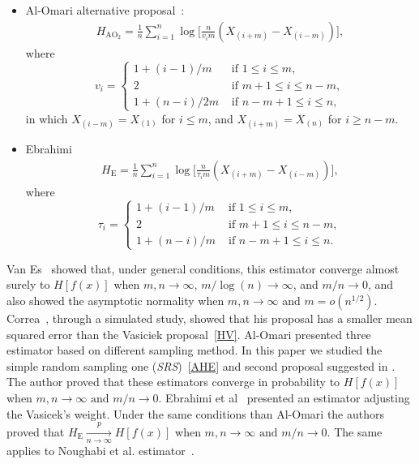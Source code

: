 \documentclass[journal]{IEEEtran}
\begin{document}
\begin{itemize}
		\item Al-Omari alternative proposal~\cite{AlOmari2016}:
		\label{AO2}
		\begin{align}
			H_{{\text{AO}}_2}=\frac{1}{n} \sum_{i=1}^{n} \log \Big[\frac{n}{v_{i} m}\left(X_{(i+m)}-X_{(i-m)}\right)\Big],
		\end{align}
		where
		\begin{equation*}
			v_{i}=\begin{cases}
				1+(i-1)/m & \text{ if }1 \leq i \leq m, \\
				2 & \text{ if } m+1 \leq i \leq n-m, \\
				1+(n-i)/2m & \text{ if } n-m+1 \leq i \leq n,
			\end{cases}
		\end{equation*}
		in which $X_{(i-m)}=X_{(1)}$ for $i \leq m$, and $X_{(i+m)}=X_{(n)}$ for $i \geq n-m$.
		\item Ebrahimi~\cite{Ebrahimi94}
		\begin{align}
			H_\text{E}=\frac{1}{n} \sum_{i=1}^{n} \log \Big[\frac{n}{\tau_{i} m}\left(X_{(i+m)}-X_{(i-m)}\right)\Big],
			\label{HE}
		\end{align}
		where
		\begin{equation*}
			\tau_{i}=\begin{cases}
				1+(i-1)/m & \text{ if }1 \leq i \leq m, \\
				2 & \text{ if } m+1 \leq i \leq n-m, \\
				1+(n-i)/m & \text{ if } n-m+1 \leq i \leq n.
			\end{cases}
		\end{equation*}
	\end{itemize}

Van Es~\cite{VanEs92} showed that, under general conditions, this estimator converge almost surely to $H[f(x)]$ when $m, n \to \infty$, $m/\log(n) \to \infty$, and $m/n \to 0$, and also showed the asymptotic normality when $m, n \to \infty$ and $m = o(n^{1/2})$. 
Correa~\cite{Correa95}, through a simulated study, showed that his proposal has a smaller mean squared error than the Vasiciek proposal~\eqref{HV}. Al-Omari\cite{AlOmari2014} presented three estimator based on different sampling method. In this paper we studied the simple random sampling one (\textit{SRS})~\eqref{AHE} and second proposal suggested
in \cite{AlOmari2016}. The author proved that these estimators converge in probability to $ H[f(x)]$ when $m, n \to \infty  \text{ and } m/n \to 0$. Ebrahimi et al~\cite{Ebrahimi94} presented an estimator adjusting the Vasicek's\cite{Vasicek76} weight. Under the same conditions than Al-Omari\cite{AlOmari2014} the authors proved that $H_{\text{E}}\underset{n \to \infty}{\overset{p}{\longrightarrow}} H[f(x)]$ when $m, n \to \infty  \text{ and } m/n \to 0$. The same applies to Noughabi et al. estimator~\cite{Noughabi2010}.
\end{document}
